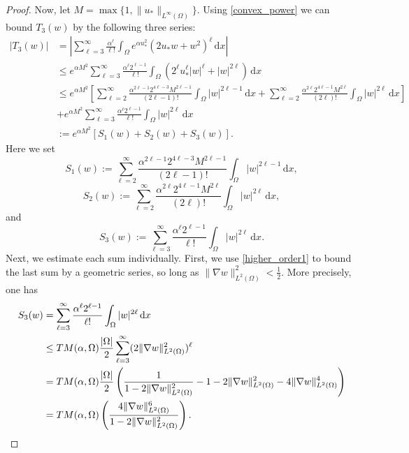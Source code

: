 \documentclass[10pt,a4paper]{amsart}
\newcommand{\ud}{\,\mathrm{d}}
\begin{document}
\begin{proof}
    \noindent Now, let $M = \max \{ 1, \| u_*\|_{L^\infty (\Omega)} \}$. Using \eqref{convex_power}
    we can bound $T_3(w)$ by the following three series: 
    \begin{align} \label{higher_order3} 
    |T_3(w)| & =  \left | \sum_{\ell=3}^\infty \frac{\alpha^\ell}{\ell !} \int_\Omega 
    e^{\alpha u_*^2} (2u_* w + w^2)^{\ell} \ud x \right | \\ \nonumber 
    & \leq  e^{\alpha M^2} \sum_{\ell=3}^\infty  \frac{\alpha^\ell 2^{\ell-1}}{\ell !} 
    \int_\Omega (2^\ell u_*^\ell |w|^\ell + |w|^{2\ell} ) \ud x \\ \nonumber 
    & \leq e^{\alpha M^2} \left [ \sum_{\ell=2}^\infty \frac{\alpha^{2\ell-1} 2^{4\ell-3} M^{2\ell-1} }
    {(2\ell-1) !} \int_\Omega |w|^{2\ell-1} \ud x + \sum_{\ell=2}^\infty \frac{\alpha^{2\ell} 2^{4\ell-1}
    M^{2\ell} }{(2\ell)!} \int_\Omega |w|^{2\ell} \ud x  \right ] \\ \nonumber 
    &+ e^{\alpha M^2} \sum_{\ell=3}^\infty \frac{\alpha^\ell 2^{\ell-1}}{\ell !}
    \int_\Omega |w|^{2\ell} \ud x\\ \nonumber 
    &:= e^{\alpha M^2} [S_1(w)+ S_2(w)+S_3(w)]. 
    \end{align} 
    Here we set
    \[
    S_1(w):= \sum_{\ell=2}^\infty \frac{\alpha^{2\ell-1} 2^{4\ell-3} M^{2\ell-1} }
    {(2\ell-1) !} \int_\Omega |w|^{2\ell-1} \ud x,
    \]
    \[
    S_2(w):=\sum_{\ell = 2}^\infty \frac{\alpha^{2\ell} 2^{4\ell-1}M^{2\ell} }{(2\ell)!}
    \int_\Omega |w|^{2\ell} \ud x,
    \]
    and
    \[
    S_3(w):=\sum_{\ell=3}^\infty \frac{\alpha^\ell 2^{\ell-1}}{\ell !}
    \int_\Omega |w|^{2\ell} \ud x.
    \]
    \noindent Next, we estimate each sum individually. First, we use \eqref{higher_order1} to bound the 
    last sum by a geometric series, so long as 
    $\| \nabla w \|_{L^2(\Omega)}^2 < \frac{1}{2} .$
    More precisely, one has
    \begin{align*} 
    S_3(w) & = \sum_{\ell=3}^\infty \frac{\alpha^\ell 2^{\ell-1}}{\ell !}
    \int_\Omega |w|^{2\ell} \ud x \\ \nonumber 
    & \leq {\rm TM}(\alpha,\Omega) \frac{|\Omega |}{2} \sum_{\ell=3}^\infty(2\| 
    \nabla w\|_{L^2(\Omega)}^2)^\ell \\ \nonumber 
    & = {\rm TM}(\alpha,\Omega)\frac{|\Omega|}{2} \left ( \frac{1}{1-2\|\nabla w\|_{L^2(\Omega)}^2}
    - 1 - 2\| \nabla w\|_{L^2(\Omega)}^2 - 4\| \nabla w\|_{L^2(\Omega)}^4 \right ) \\ \nonumber 
    & = {\rm TM}(\alpha,\Omega)\left(\frac{4\| \nabla w \|_{L^2(\Omega)}^6}{1-2\| \nabla w \|_{L^2(\Omega)}^2}\right). 

\end{align*}
\end{proof}
\end{document}
